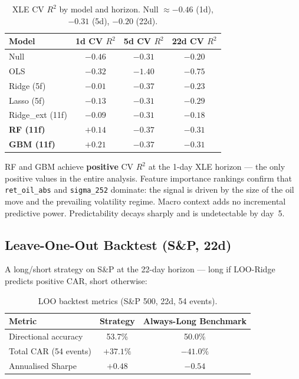 \documentclass[11pt,a4paper]{article}
\begin{document}
\begin{table}[H]
\centering
\caption{XLE CV $R^2$ by model and horizon. Null $\approx -0.46$ (1d), $-0.31$ (5d), $-0.20$ (22d).}
\label{tab:xle_results}
\small
\begin{tabular}{lccc}
\toprule
Model & 1d CV $R^2$ & 5d CV $R^2$ & 22d CV $R^2$ \\
\midrule
Null & $-0.46$ & $-0.31$ & $-0.20$ \\
OLS  & $-0.32$ & $-1.40$ & $-0.75$ \\
Ridge (5f) & $-0.01$ & $-0.37$ & $-0.23$ \\
Lasso (5f) & $-0.13$ & $-0.31$ & $-0.29$ \\
\midrule
Ridge\_ext (11f) & $-0.09$ & $-0.31$ & $-0.18$ \\
\textbf{RF (11f)}  & $\mathbf{+0.14}$ & $-0.37$ & $-0.31$ \\
\textbf{GBM (11f)} & $\mathbf{+0.21}$ & $-0.37$ & $-0.31$ \\
\bottomrule
\end{tabular}
\end{table}

RF and GBM achieve \textbf{positive} CV $R^2$ at the 1-day XLE horizon — the only positive values in the entire analysis. Feature importance rankings confirm that \texttt{ret\_oil\_abs} and \texttt{sigma\_252} dominate: the signal is driven by the size of the oil move and the prevailing volatility regime. Macro context adds no incremental predictive power. Predictability decays sharply and is undetectable by day~5.

\subsection{Leave-One-Out Backtest (S\&P, 22d)}

A long/short strategy on S\&P at the 22-day horizon — long if LOO-Ridge predicts positive CAR, short otherwise:

\begin{table}[H]
\centering
\caption{LOO backtest metrics (S\&P 500, 22d, 54 events).}
\begin{tabular}{lcc}
\toprule
Metric & Strategy & Always-Long Benchmark \\
\midrule
Directional accuracy & 53.7\% & 50.0\% \\
Total CAR (54 events) & $+37.1\%$ & $-41.0\%$ \\
Annualised Sharpe & $+0.48$ & $-0.54$ \\
\bottomrule
\end{tabular}
\end{table}
\end{document}
